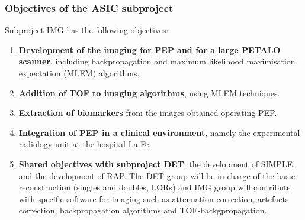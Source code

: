 \subsubsection*{Objectives of the ASIC subproject}
Subproject IMG has the following objectives:
\begin{enumerate}
\item {\bf Development of the imaging for PEP and for a large PETALO scanner}, including backpropagation and maximum likelihood maximisation expectation (MLEM) algorithms.
\item {\bf Addition of TOF to imaging algorithms}, using MLEM techniques. 
\item {\bf  Extraction of biomarkers} from the images obtained operating PEP. 
\item {\bf Integration of PEP in a clinical environment}, namely the experimental radiology unit at the hospital La Fe. 
\item {\bf Shared objectives with subproject DET}: the development of SIMPLE, and the development of RAP. The DET group will be in charge of the basic reconstruction (singles and doubles, LORs) and IMG group will contribute with specific software for imaging such as attenuation correction, artefacts correction, backpropagation algorithms and TOF-backgpropagation.
\end{enumerate}
